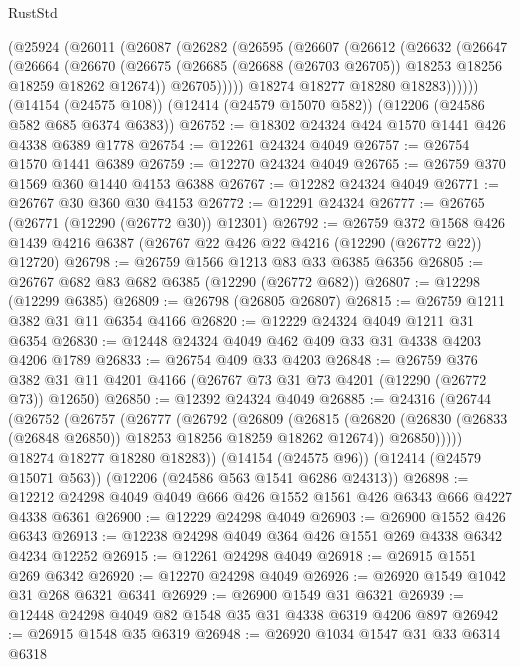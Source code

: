 \begin{lexlean}{RustStd}
\begin{coremodule}
    (@25924
      (@26011
        (@26087
          (@26282
            (@26595
              (@26607
                (@26612
                  (@26632
                    (@26647
                      (@26664
                        (@26670
                          (@26675
                            (@26685 (@26688 (@26703 @26705)) @18253 @18256 @18259 @18262 @12674))
                          @26705)))))
                @18274
                @18277
                @18280
                @18283))))))
    (@14154 (@24575 @108))
    (@12414 (@24579 @15070 @582))
    (@12206 (@24586 @582 @685 @6374 @6383))
@26752 := @18302 @24324 @424 @1570 @1441 @426 @4338 @6389 @1778
@26754 := @12261 @24324 @4049
@26757 := @26754 @1570 @1441 @6389
@26759 := @12270 @24324 @4049
@26765 := @26759 @370 @1569 @360 @1440 @4153 @6388
@26767 := @12282 @24324 @4049
@26771 := @26767 @30 @360 @30 @4153
@26772 := @12291 @24324
@26777 := @26765 (@26771 (@12290 (@26772 @30)) @12301)
@26792 := @26759
    @372
    @1568
    @426
    @1439
    @4216
    @6387
    (@26767 @22 @426 @22 @4216 (@12290 (@26772 @22)) @12720)
@26798 := @26759 @1566 @1213 @83 @33 @6385 @6356
@26805 := @26767 @682 @83 @682 @6385 (@12290 (@26772 @682))
@26807 := @12298 (@12299 @6385)
@26809 := @26798 (@26805 @26807)
@26815 := @26759 @1211 @382 @31 @11 @6354 @4166
@26820 := @12229 @24324 @4049 @1211 @31 @6354
@26830 := @12448 @24324 @4049 @462 @409 @33 @31 @4338 @4203 @4206 @1789
@26833 := @26754 @409 @33 @4203
@26848 := @26759
    @376
    @382
    @31
    @11
    @4201
    @4166
    (@26767 @73 @31 @73 @4201 (@12290 (@26772 @73)) @12650)
@26850 := @12392 @24324 @4049
@26885 := @24316
    (@26744
      (@26752
        (@26757
          (@26777
            (@26792
              (@26809
                (@26815
                  (@26820 (@26830 (@26833 (@26848 @26850)) @18253 @18256 @18259 @18262 @12674))
                  @26850)))))
        @18274
        @18277
        @18280
        @18283))
    (@14154 (@24575 @96))
    (@12414 (@24579 @15071 @563))
    (@12206 (@24586 @563 @1541 @6286 @24313))
@26898 := @12212 @24298 @4049 @4049 @666 @426 @1552 @1561 @426 @6343 @666 @4227 @4338 @6361
@26900 := @12229 @24298 @4049
@26903 := @26900 @1552 @426 @6343
@26913 := @12238 @24298 @4049 @364 @426 @1551 @269 @4338 @6342 @4234 @12252
@26915 := @12261 @24298 @4049
@26918 := @26915 @1551 @269 @6342
@26920 := @12270 @24298 @4049
@26926 := @26920 @1549 @1042 @31 @268 @6321 @6341
@26929 := @26900 @1549 @31 @6321
@26939 := @12448 @24298 @4049 @82 @1548 @35 @31 @4338 @6319 @4206 @897
@26942 := @26915 @1548 @35 @6319
@26948 := @26920 @1034 @1547 @31 @33 @6314 @6318

\end{coremodule}
\end{lexlean}
